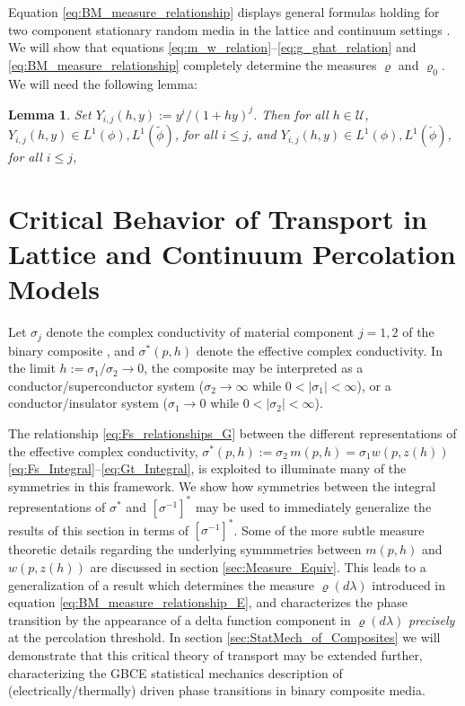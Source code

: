 \documentclass[english,12pt,jmp,graphicx]{revtex4-1}
\newtheorem{lemma}{Lemma}[section]
\begin{document}
%
Equation \eqref{eq:BM_measure_relationship} displays general formulas
holding for two component stationary random media in the lattice and
continuum settings \cite{Golden:PRL-3935}. We will show that equations
\eqref{eq:m_w_relation}--\eqref{eq:g_ghat_relation} and
\eqref{eq:BM_measure_relationship} completely determine the measures
$\varrho$ and $\varrho_0$. We will need the following lemma:
\begin{lemma}\label{lem:h_diff_commutation}  
  Set $Y_{i,j}(h,y):=y^i/(1+hy)^j$. Then for all $h\in\mathcal{U}$,
  $Y_{i,j}(h,y)\in L^1(\phi),L^1(\tilde{\phi})$, for all $i\leq j$, and
  $Y_{i,j}(h,y)\in L^1(\phi),L^1(\check{\phi})$, for all $i\leq j$,   
\end{lemma}
%



\section{Critical Behavior of Transport in Lattice and Continuum
  Percolation Models}
\label{sec:Crit_Behav_of_Transport}
 Let $\sigma_j$ denote the
complex conductivity of material component $j=1,2$ of the binary
composite \cite{Efros:PSSB-303}, and $\sigma^*(p,h)$ denote the effective
complex conductivity. In the limit $h:=\sigma_1/\sigma_2\to0$, the composite may  
be interpreted as a conductor/superconductor system ($\sigma_2\to\infty$ while
$0<|\sigma_1|<\infty$), or a conductor/insulator system ($\sigma_1\to0$ while
$0<|\sigma_2|<\infty$). 

The relationship \eqref{eq:Fs_relationships_G} between the different 
representations of the effective complex conductivity,
$\sigma^*(p,h):=\sigma_2\,m(p,h)=\sigma_1w(p,z(h))$
\eqref{eq:Fs_Integral}--\eqref{eq:Gt_Integral}, is exploited to
illuminate many of the symmetries in this framework. We show how 
symmetries between the integral representations of $\sigma^*$ and
$[\sigma^{-1}]^*$ may be used to immediately generalize the results of
this section in terms of $[\sigma^{-1}]^*$. Some of the more subtle measure
theoretic details regarding the underlying symmmetries between
$m(p,h)$ and $w(p,z(h))$ are discussed in section
\ref{sec:Measure_Equiv}. This leads to a generalization of a result
\cite{Day:JPCM-96} which determines the measure $\varrho(d\lambda)$ introduced in
equation \eqref{eq:BM_measure_relationship_E}, and characterizes the
phase transition by the appearance of a delta function component in
$\varrho(d\lambda)$ \emph{precisely} at the percolation threshold. In section
\ref{sec:StatMech_of_Composites} we will demonstrate that this
critical theory of transport may be extended further, characterizing 
the GBCE statistical mechanics description of (electrically/thermally)
driven phase transitions in binary composite media.           
%
\end{document}
